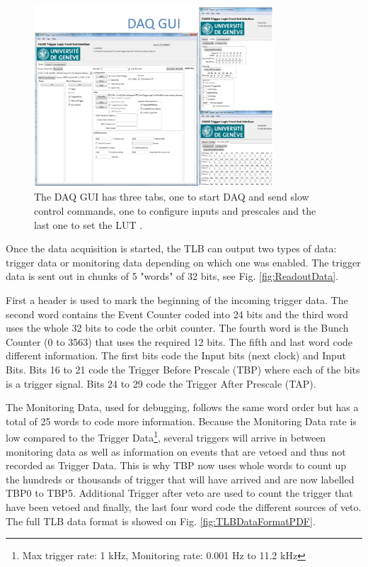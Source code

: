 \begin{figure}[htbp!] 
\centering    
\includegraphics[width=0.8\textwidth]{ChapterDAQ/Figs/GeneralDAQ/DAQGui.jpg}
\caption[DAQ GUI]{The DAQ GUI has three tabs, one to start DAQ and send slow control commands, one to configure inputs and prescales and the last one to set the LUT \cite{debieux_faser_2019}.}
\label{fig:DAQGui}
\end{figure}

Once the data acquisition is started, the TLB can output two types of data: trigger data or monitoring data depending on which one was enabled. The trigger data is sent out in chunks  of 5 "words" of 32 bits, see Fig. \ref{fig:ReadoutData}.

First a header is used to mark the beginning of the incoming trigger data. The second word contains the Event Counter coded into 24 bits and the third word uses the whole 32 bits to code the orbit counter. The fourth word is the Bunch Counter (0 to 3563) that uses the required 12 bits. The fifth and last word code different information. The first bits code the Input bits (next clock) and Input Bits. Bits 16 to 21 code the Trigger Before Prescale (TBP) where each of the bits is a trigger signal. Bits 24 to 29 code the Trigger After Prescale (TAP).

The Monitoring Data, used for debugging, follows the same word order but has a total of 25 words to code more information. Because the Monitoring Data rate is low compared to the Trigger Data\footnote{Max trigger rate: 1 kHz, Monitoring rate: 0.001 Hz to 11.2 kHz}, several triggers will arrive in between monitoring data as well as information on events that are vetoed and thus not recorded as Trigger Data. This is why TBP now uses whole words to count up the hundreds or thousands of trigger that will have arrived and are now labelled TBP0 to TBP5. Additional Trigger after veto are used to count the trigger that have been vetoed and finally, the last four word code the different sources of veto. The full TLB data format is showed on Fig. \ref{fig:TLBDataFormatPDF}.



